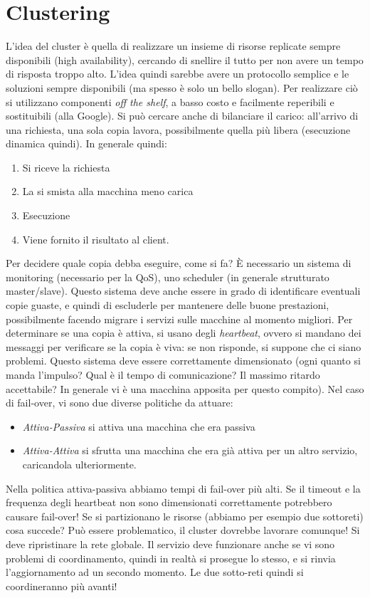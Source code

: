 \section{Clustering}
L'idea del cluster è quella di realizzare un insieme di risorse replicate
sempre disponibili (high availability),
cercando di snellire il tutto per non avere un tempo di risposta troppo alto.
L'idea quindi sarebbe avere un protocollo
semplice e le soluzioni sempre disponibili (ma spesso è solo un bello slogan).
Per realizzare ciò si utilizzano componenti \textit{off the shelf}, a basso
costo e facilmente reperibili e
sostituibili (alla Google). Si può cercare anche di bilanciare il carico:
all'arrivo di una richiesta, una sola copia
lavora, possibilmente quella più libera (esecuzione dinamica quindi). In
generale quindi:
\begin{enumerate}
 \item Si riceve la richiesta
 \item La si smista alla macchina meno carica
 \item Esecuzione
 \item Viene fornito il risultato al client.
\end{enumerate}
Per decidere quale copia debba eseguire, come si fa? È necessario un sistema di
monitoring (necessario per la QoS),
uno scheduler (in generale strutturato master/slave). Questo sistema deve anche
essere in grado di identificare
eventuali copie guaste, e quindi di escluderle per mantenere delle buone
prestazioni, possibilmente facendo migrare i
servizi sulle macchine al momento migliori. Per determinare se una copia è
attiva, si usano degli \textit{heartbeat},
ovvero si mandano dei messaggi per verificare se la copia è viva: se non
risponde, si suppone che ci siano problemi.
Questo sistema deve essere correttamente dimensionato (ogni quanto si manda
l'impulso? Qual è il tempo di
comunicazione? Il massimo ritardo accettabile? In generale vi è una macchina
apposita per questo compito).
Nel caso di fail-over, vi sono due diverse politiche da attuare:
\begin{itemize}
 \item \textit{Attiva-Passiva} si attiva una macchina che era passiva
 \item \textit{Attiva-Attiva} si sfrutta una macchina che era già attiva
 per un altro servizio, caricandola ulteriormente.
\end{itemize}
Nella politica attiva-passiva abbiamo tempi di fail-over più alti.
Se il timeout e la frequenza degli heartbeat non sono dimensionati
correttamente potrebbero causare fail-over!
Se si partizionano le risorse (abbiamo per esempio due sottoreti) cosa succede?
Può essere problematico, il cluster
dovrebbe lavorare comunque! Si deve ripristinare la rete globale. Il servizio
deve funzionare anche se vi sono problemi
di coordinamento, quindi in realtà si prosegue lo stesso, e si rinvia
l'aggiornamento ad un secondo momento. Le due
sotto-reti quindi si coordineranno più avanti!
